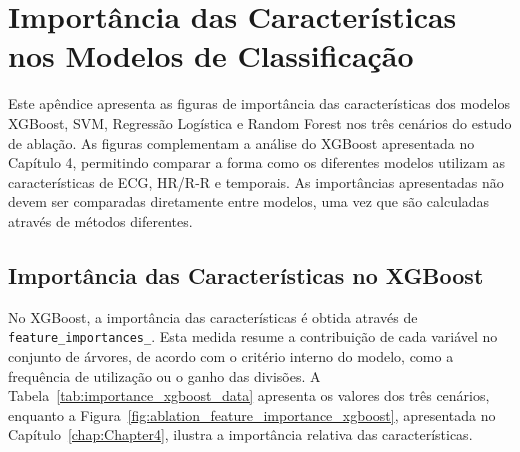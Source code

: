 
\chapter{Importância das Características nos Modelos de Classificação}
\label{AppendixD}

\renewcommand{\thetable}{\thechapter.\arabic{table}}
\renewcommand{\thefigure}{\thesection}

Este apêndice apresenta as figuras de importância das características dos modelos XGBoost, SVM, Regressão Logística e Random Forest nos três cenários do estudo de ablação. As figuras complementam a análise do XGBoost apresentada no Capítulo 4, permitindo comparar a forma como os diferentes modelos utilizam as características de ECG, HR/R-R e temporais. As importâncias apresentadas não devem ser comparadas diretamente entre modelos, uma vez que são calculadas através de métodos diferentes.

\section{Importância das Características no XGBoost}

\begin{sloppypar}
No XGBoost, a importância das características é obtida através de \texttt{feature\_importances\_}. Esta medida resume a contribuição de cada variável no conjunto de árvores, de acordo com o critério interno do modelo, como a frequência de utilização ou o ganho das divisões. A Tabela~\ref{tab:importance_xgboost_data} apresenta os valores dos três cenários, enquanto a Figura~\ref{fig:ablation_feature_importance_xgboost}, apresentada no Capítulo~\ref{chap:Chapter4}, ilustra a importância relativa das características.
\end{sloppypar}

